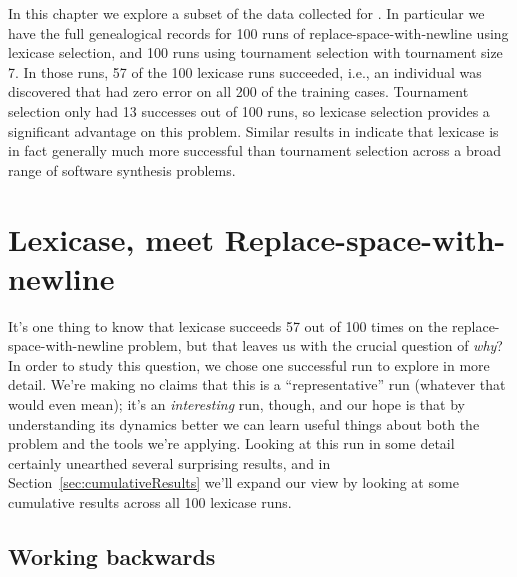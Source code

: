 In this chapter we explore a subset of the data collected for \citep{Helmuth:2015:GPTP}. In particular
we have the full genealogical records for 100 runs of replace-space-with-newline using 
lexicase selection, and 100 runs using tournament
selection with tournament size 7. In those
runs, 57 of the 100 lexicase runs succeeded, i.e., an individual was discovered that had zero
error on all 200 of the training cases. Tournament selection only
had 13 successes out of 100 runs, so
lexicase selection provides a significant advantage on this problem. Similar results in \citep{Helmuth:2015:GECCO}
indicate that lexicase is in fact generally much more successful than tournament selection across a broad range of
software synthesis problems.

\section{Lexicase, meet Replace-space-with-newline}
\label{sec:lexicaseRun}


It's one thing to know that lexicase succeeds 57 out of 100 times on the replace-space-with-newline problem, but that
leaves us with the crucial question of \emph{why}? In order to study this question, we chose one successful 
run to explore in more detail.
We're making no claims that this is a ``representative'' run (whatever that would even
mean); it's an \emph{interesting} run, though, and our hope is that by understanding its dynamics
better we can learn useful things about both the problem and the tools we're applying. Looking at this run in some
detail certainly unearthed several surprising results, and in Section~\ref{sec:cumulativeResults}
we'll expand our view by looking at some cumulative results across all 100 lexicase runs.

\subsection{Working backwards}

